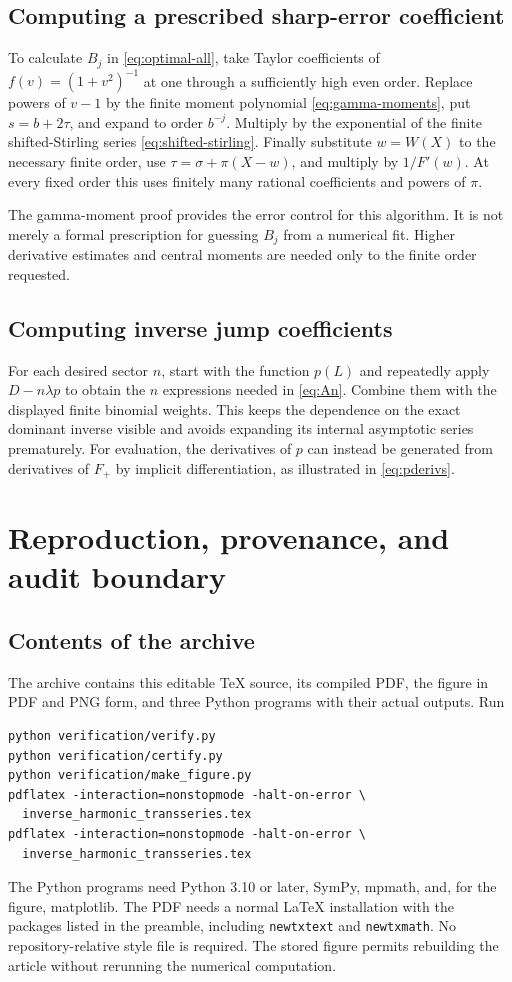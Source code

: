 \documentclass[11pt,a4paper]{article}
\theoremstyle{definition}
\numberwithin{equation}{section}
\begin{document}
\subsection{Computing a prescribed sharp-error coefficient}
To calculate $B_j$ in \eqref{eq:optimal-all}, take Taylor coefficients of $f(v)=(1+v^2)^{-1}$ at one through a sufficiently high even order. Replace powers of $v-1$ by the finite moment polynomial \eqref{eq:gamma-moments}, put $s=b+2\tau$, and expand to order $b^{-j}$. Multiply by the exponential of the finite shifted-Stirling series \eqref{eq:shifted-stirling}. Finally substitute $w=W(X)$ to the necessary finite order, use $\tau=\sigma+\pi(X-w)$, and multiply by $1/F'(w)$. At every fixed order this uses finitely many rational coefficients and powers of $\pi$.

The gamma-moment proof provides the error control for this algorithm. It is not merely a formal prescription for guessing $B_j$ from a numerical fit. Higher derivative estimates and central moments are needed only to the finite order requested.

\subsection{Computing inverse jump coefficients}
For each desired sector $n$, start with the function $p(L)$ and repeatedly apply $D-n\lambda p$ to obtain the $n$ expressions needed in \eqref{eq:An}. Combine them with the displayed finite binomial weights. This keeps the dependence on the exact dominant inverse visible and avoids expanding its internal asymptotic series prematurely. For evaluation, the derivatives of $p$ can instead be generated from derivatives of $F_+$ by implicit differentiation, as illustrated in \eqref{eq:pderivs}.

\section{Reproduction, provenance, and audit boundary}
\label{app:reproduction}

\subsection{Contents of the archive}
The archive contains this editable TeX source, its compiled PDF, the figure in PDF and PNG form, and three Python programs with their actual outputs. Run
\begin{verbatim}
python verification/verify.py
python verification/certify.py
python verification/make_figure.py
pdflatex -interaction=nonstopmode -halt-on-error \
  inverse_harmonic_transseries.tex
pdflatex -interaction=nonstopmode -halt-on-error \
  inverse_harmonic_transseries.tex
\end{verbatim}
The Python programs need Python 3.10 or later, SymPy, mpmath, and, for the figure, matplotlib. The PDF needs a normal LaTeX installation with the packages listed in the preamble, including \texttt{newtxtext} and \texttt{newtxmath}. No repository-relative style file is required. The stored figure permits rebuilding the article without rerunning the numerical computation.
\end{document}
